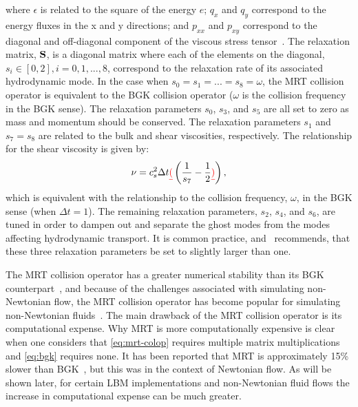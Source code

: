 \noindent where $\epsilon$ is related to the square of the energy $e$; $q_x$ and $q_y$ correspond to the energy fluxes in the x and y directions; and $p_{xx}$ and $p_{xy}$ correspond to the diagonal and off-diagonal component of the viscous stress tensor~\cite{lallemand2000theory}.
The relaxation matrix, $\mathbf{S}$, is a diagonal matrix where each of the elements on the diagonal, $s_i \in [0, 2], i = 0, 1, ..., 8$, correspond to the relaxation rate of its associated hydrodynamic mode.
In the case when $s_0 = s_1 = ... = s_8 = \omega$, the MRT collision operator is equivalent to the BGK collision operator ($\omega$ is the collision frequency in the BGK sense).
The relaxation parameters $s_0$, $s_3$, and $s_5$ are all set to zero as mass and momentum should be conserved.
The relaxation parameters $s_1$ and $s_7 = s_8$ are related to the bulk and shear viscosities, respectively.
The relationship for the shear viscosity is given by:
\begin{equation} \label{eq:mrt-s7}
\nu = c_s^2 \Delta t \DIFdelbegin \DIFdel{(}\DIFdelend \DIFaddbegin \left(\DIFaddend \frac{1}{s_7} - \frac{1}{2}\DIFdelbegin \DIFdel{)}\DIFdelend \DIFaddbegin \right)\DIFaddend ,
\end{equation}
\noindent which is equivalent with the relationship to the collision frequency, $\omega$, in the BGK sense (when $\Delta t = 1$).
The remaining relaxation parameters, $s_2$, $s_4$, and $s_6$, are tuned in order to dampen out and separate the ghost modes from the modes affecting hydrodynamic transport.
It is common practice, and~\citet{lallemand2000theory} recommends, that these three relaxation parameters be set to slightly larger than one.

The MRT collision operator has a greater numerical stability than its BGK counterpart~\cite{lallemand2000theory,dellar2003incompressible,d2002multiple}, and because of the challenges associated with simulating non-Newtonian flow, the MRT collision operator has become popular for simulating non-Newtonian fluids~\cite{chen2014simulations,fallah2012multiple,tang2011bingham,vikhansky2008lattice,chai2011multiple,grasinger2015simulation}.
The main drawback of the MRT collision operator is its computational expense.
Why MRT is more computationally expensive is clear when one considers that \eqref{eq:mrt-colop} requires multiple matrix multiplications and \eqref{eq:bgk} requires none.
It has been reported that MRT is approximately 15\% slower than BGK~\cite{d2002multiple}, but this was in the context of Newtonian flow.
As will be shown later, for certain LBM implementations and non-Newtonian fluid flows the increase in computational expense can be much greater.

